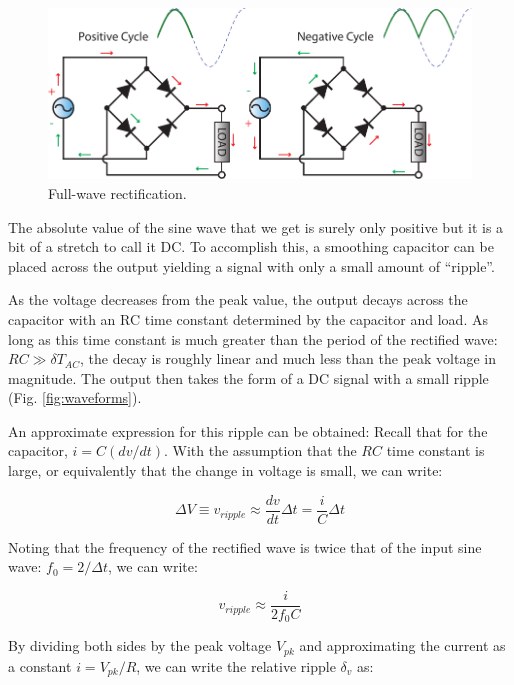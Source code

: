 \documentclass{tufte-book}
\begin{document}
\begin{figure}[h]
\caption{Full-wave rectification.}
\label{fig:fullwave}
\begin{center}
\includegraphics[width=\textwidth]{fullwave_explanation}
\end{center}
\end{figure}

The absolute value of the sine wave that we get is surely only positive but it is a bit of a stretch to call it DC. To accomplish this, a smoothing capacitor can be placed across the output yielding a signal with only a small amount of ``ripple''.  

As the voltage decreases from the peak value, the output decays across the capacitor with an RC time constant determined by the capacitor and load. As long as this time constant is much greater than the period of the rectified wave: $RC \gg \delta T_{AC}$, the decay is roughly linear and much less than the peak voltage in magnitude. The output then takes the form of a DC signal with a small ripple (Fig. \ref{fig:waveforms}).

An approximate expression for this ripple can be obtained: Recall that for the capacitor, $i = C (dv/dt)$. With the assumption that the $RC$ time constant is large, or equivalently that the change in voltage is small, we can write:

\begin{equation}
\label{eq:ripple_fullwave}
\Delta V \equiv v_{ripple} \approx \frac{dv}{dt}\Delta t = \frac{i}{C}\Delta t
\end{equation}

Noting that the frequency of the rectified wave is twice that of the input sine wave: $f_0 = 2/\Delta t$, we can write:

\begin{equation}
\label{eq:abs_ripple}
v_{ripple} \approx  \frac{i}{2f_0C}
\end{equation}

\noindent By dividing both sides by the peak voltage $V_{pk}$ and approximating the current as a constant $i = V_{pk}/R$, we can write the relative ripple $\delta_v$ as:
\end{document}
